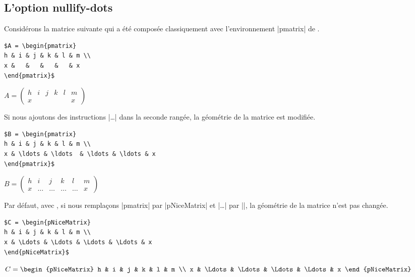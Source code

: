 \documentclass[dvipsnames]{article}%
\begin{document}
\subsection{L'option nullify-dots}

Considérons la matrice suivante qui a été composée classiquement avec
l'environnement |{pmatrix}| de .\par\nobreak

\medskip
\begin{BVerbatim}[baseline=c,boxwidth=10cm]
$A = \begin{pmatrix}
h & i & j & k & l & m \\
x &   &   &   &   & x 
\end{pmatrix}$
\end{BVerbatim}
$A = \begin{pmatrix}
h & i & j & k & l & m \\
x   &     &     &    &     & x 
\end{pmatrix}$


\bigskip
Si nous ajoutons des instructions |\ldots| dans la seconde rangée, la géométrie
de la matrice est modifiée.\par\nobreak

\medskip
\begin{BVerbatim}[baseline=c,boxwidth=10cm]
$B = \begin{pmatrix}
h & i & j & k & l & m \\
x & \ldots & \ldots  & \ldots & \ldots & x 
\end{pmatrix}$
\end{BVerbatim}
$B = \begin{pmatrix}
h & i & j & k & l & m \\
x   & \ldots   & \ldots  & \ldots & \ldots & x 
\end{pmatrix}$

\bigskip
Par défaut, avec , si nous remplaçons |{pmatrix}| par
|{pNiceMatrix}| et |\ldots| par |\Ldots|, la géométrie de la matrice n'est pas
changée.\par\nobreak

\medskip
\begin{BVerbatim}[baseline=c,boxwidth=10cm]
$C = \begin{pNiceMatrix}
h & i & j & k & l & m \\
x & \Ldots & \Ldots & \Ldots & \Ldots & x 
\end{pNiceMatrix}$
\end{BVerbatim}
$C = \begin{pNiceMatrix}
h & i & j & k & l & m \\
x & \Ldots & \Ldots  & \Ldots & \Ldots & x 
\end{pNiceMatrix}$
\end{document}

